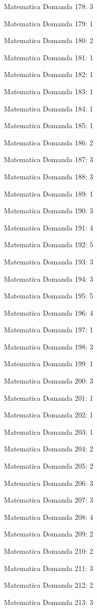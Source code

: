 \documentclass[20pt, a4paper]{article}
\begin{document}
\begin{itemize}[leftmargin=*]
\item [Matematica] Domanda 178: 3
\item [Matematica] Domanda 179: 1
\item [Matematica] Domanda 180: 2
\item [Matematica] Domanda 181: 1
\item [Matematica] Domanda 182: 1
\item [Matematica] Domanda 183: 1
\item [Matematica] Domanda 184: 1
\item [Matematica] Domanda 185: 1
\item [Matematica] Domanda 186: 2
\item [Matematica] Domanda 187: 3
\item [Matematica] Domanda 188: 3
\item [Matematica] Domanda 189: 1
\item [Matematica] Domanda 190: 3
\item [Matematica] Domanda 191: 4
\item [Matematica] Domanda 192: 5
\item [Matematica] Domanda 193: 3
\item [Matematica] Domanda 194: 3
\item [Matematica] Domanda 195: 5
\item [Matematica] Domanda 196: 4
\item [Matematica] Domanda 197: 1
\item [Matematica] Domanda 198: 3
\item [Matematica] Domanda 199: 1
\item [Matematica] Domanda 200: 3
\item [Matematica] Domanda 201: 1
\item [Matematica] Domanda 202: 1
\item [Matematica] Domanda 203: 1
\item [Matematica] Domanda 204: 2
\item [Matematica] Domanda 205: 2
\item [Matematica] Domanda 206: 3
\item [Matematica] Domanda 207: 3
\item [Matematica] Domanda 208: 4
\item [Matematica] Domanda 209: 2
\item [Matematica] Domanda 210: 2
\item [Matematica] Domanda 211: 3
\item [Matematica] Domanda 212: 2
\item [Matematica] Domanda 213: 3

\end{itemize}
\end{document}
